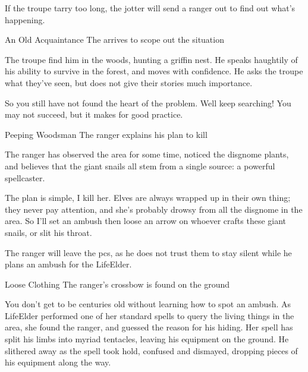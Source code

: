 
If the troupe tarry too long, the \gls{jotter} will send a ranger out to find out what's happening.

{An Old Acquaintance}%
{The  arrives to scope out the situation}%

The troupe find him in the woods, hunting a griffin nest.
He speaks haughtily of his ability to survive in the forest, and moves with confidence.
He asks the troupe what they've seen, but does not give their stories much importance.

\begin{speechtext}
  So you still have not found the heart of the problem.
  Well keep searching!
  You may not succeed, but it makes for good practice.
\end{speechtext}

{Peeping Woodsman}%
{The ranger explains his plan to kill }%

The \gls{ranger} has observed the area for some time, noticed the \gls{disgnome} plants, and believes that the giant snails all stem from a single source: a powerful spellcaster.

\begin{speechtext}
  The plan is simple, I kill her.
  Elves are always wrapped up in their own thing; they never pay attention, and she's probably drowsy from all the \gls{disgnome} in the area.
  So I'll set an ambush then loose an arrow on whoever crafts these giant snails, or slit his throat.
\end{speechtext}

The \gls{ranger} will leave the \glspl{pc}, as he does not trust them to stay silent while he plans an ambush for the \gls{LifeElder}.

{Loose Clothing}%
{The ranger's crossbow is found on the ground}%

\begin{speechtext}
  You don't get to be centuries old without learning how to spot an ambush.
  As \gls{LifeElder} performed one of her standard spells to query the living things in the area, she found the ranger, and guessed the reason for his hiding.
  Her spell has split his limbs into myriad tentacles, leaving his equipment on the ground.
  He slithered away as the spell took hold, confused and dismayed, dropping pieces of his equipment along the way.
\end{speechtext}

